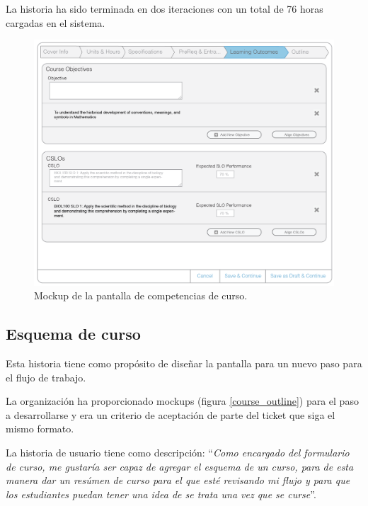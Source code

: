 La historia ha sido terminada en dos iteraciones con un total de 76 horas cargadas en el sistema.

\begin{figure}[H]
\centering
\includegraphics[scale=0.3]{Capitulos/DesarrollodelaAplicacion/Imagenes/course_learning_outcomes}
\caption{Mockup de la pantalla de competencias de curso.}
  \label{course_learning_outcomes}
\end{figure}

\subsection{Esquema de curso}
Esta historia tiene como propósito de diseñar la pantalla para un nuevo paso para el flujo de trabajo. 

La organización ha proporcionado mockups (figura \ref{course_outline}) para el paso a desarrollarse y era un criterio de aceptación de parte del ticket que siga el mismo formato.

La historia de usuario tiene como descripción: \enquote{\textit{Como encargado del formulario de curso, me gustaría ser capaz de agregar el esquema de un curso, para de esta manera dar un resúmen de curso para el que esté revisando mi flujo y para que los estudiantes puedan tener una idea de se trata una vez que se curse}}.

